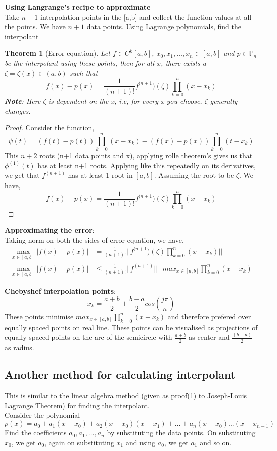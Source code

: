 \documentclass{article}
\newtheorem*{theorem}{Theorem}
\begin{document}
	\noindent\textbf{Using Langrange's recipe to approximate}\\
	Take $n+1$ interpolation points in the [a,b] and collect the function values at all the points. We have $n+1$ data points. Using Lagrange polynomials, find the interpolant\\
		

	\begin{theorem}[Error equation]
		Let $f\in C^k[a,b]$, $x_0,x_1,\hdots,x_n \in [a,b]$ and $p\in \mathbb{P}_n$ be the interpolant using these points, then for all $x$, there exists a $\zeta = \zeta(x) \in (a,b)$ such that
		\[\boxed{f(x)-p(x) = \frac{1}{(n+1)!}f^{(n+1})(\zeta)\prod_{k=0}^n(x-x_k)}\]
		\textbf{Note}: Here $\zeta$ is dependent on the x, i.e, for every x you choose, $\zeta$ generally changes.\\
	\end{theorem}

	\begin{proof}
		Consider the function,
		\[\psi(t)=(f(t)- p(t))\prod_{k=0}^n(x-x_k) - (f(x)-p(x))\prod_{k=0}^n(t-x_k)\]
		This $n+2$ roots (n+1 data points and x), applying rolle theorem's gives us that $\phi^{(1)}(t)$ has at least n+1 roots. Applying like this repeatedly on its derivatives, we get that $f^{(n+1)}$ has at least 1 root in $[a,b]$. Assuming the root to be $\zeta$. We have,
		\[f(x)-p(x) = \frac{1}{(n+1)!}f^{(n+1})(\zeta)\prod_{k=0}^n(x-x_k)\]
	\end{proof}


	\noindent\textbf{Approximating the error}:\\
	Taking norm on both the sides of error equation, we have,
	\begin{align}
		\max_{x\in [a,b]} |f(x)-p(x)| &= \frac{1}{(n+1)!}||f^{(n+1})(\zeta)\prod_{k=0}^n(x-x_k)||\\
		\max_{x\in [a,b]} |f(x)-p(x)| &\leq \frac{1}{(n+1)!} ||f^{(n+1)}||\text{ }max_{x \in [a,b]}\prod_{k=0}^n(x-x_k)
	\end{align}

	\noindent\textbf{Chebyshef interpolation points}:
		\[x_k= \frac{a+b}{2}+\frac{b-a}{2}cos\left(\frac{j\pi}{n}\right)\]
	\noindent These points minimise $max_{x \in [a,b]}\prod_{k=0}^n(x-x_k)$ and therefore prefered over equally spaced points on real line. These points can be visualised as projections of equally spaced points on the arc of the semicircle with $\frac{a+b}{2}$ as center and $\frac{(b-a)}{2}$ as radius.



\subsection{Another method for calculating interpolant}
	This is similar to the linear algebra method (given as proof(1) to Joseph-Louis Lagrange Theorem) for finding the interpolant.\\
	Consider the polynomial 
	\[p(x)= a_0 +a_1 (x-x_0) + a_2(x-x_0)(x-x_1)+ \hdots +a_n(x-x_0)...(x-x_{n-1})\]
	Find the coefficients $a_0, a_1, \hdots, a_n$ by substituting the data points. On substituting $x_0$, we get $a_0$, again on substituting $x_1$ and using $a_0$, we get $a_1$ and so on.
\end{document}
